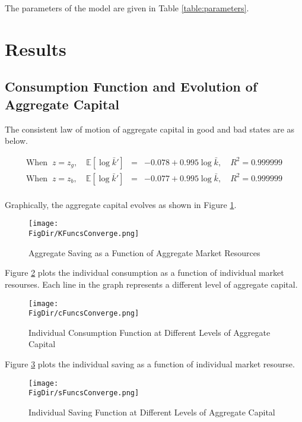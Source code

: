 \documentclass[titlepage]{\econtex}\providecommand{\texname}{KrusellSmithRep}%
\providecommand{\FigDir}{Figures}
\providecommand{\TableDir}{./Tables}
\renewcommand{\FigDir}{./Code/Python/Figures}
\begin{document}
The parameters of the model are given in Table \ref{table:parameters}.



\section{Results}

\subsection{Consumption Function and Evolution of Aggregate Capital}

The consistent law of motion of aggregate capital in good and bad states are as below. 


\begin{eqnarray*}
	\text{When }~ z=z_g, \quad \mathbb{E}[\log\bar{k}'] & = & -0.078 + 0.995 \log\bar k, \quad R^2 = 0.999999\\
	\text{When }~ z=z_b,  \quad \mathbb{E}[\log\bar{k}'] & = & -0.077 + 0.995 \log\bar k, \quad R^2 = 0.999999\\
\end{eqnarray*}

Graphically, the aggregate capital evolves as shown in Figure \ref{fig:kfunc}.
 
\begin{figure}[tbp]
	\centerline{\texttt{[image: \\FigDir/KFuncsConverge.png]}}
	\caption{Aggregate Saving as a Function of Aggregate Market Resources}
	\label{fig:kfunc}
\end{figure}

Figure \ref{fig:cfunc} plots the individual consumption as a function of individual market resourses. Each line in the graph represents a different level of aggregate capital. 

\begin{figure}[tbp]
	\centerline{\texttt{[image: \\FigDir/cFuncsConverge.png]}}
	\caption{Individual Consumption Function at Different Levels of Aggregate Capital}
	\label{fig:cfunc}
\end{figure}

Figure \ref{fig:sfunc} plots the individual saving as a function of individual market resourse.  

\begin{figure}[tbp]
	\centerline{\texttt{[image: \\FigDir/sFuncsConverge.png]}}
	\caption{Individual Saving Function at Different Levels of Aggregate Capital}
	\label{fig:sfunc}
\end{figure}
\end{document}
